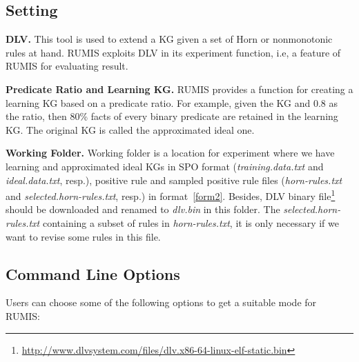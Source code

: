 \subsection{Setting}

\textbf{DLV.} This tool is used to extend a KG given a set of Horn or nonmonotonic rules at hand. RUMIS exploits DLV in its experiment function, i.e, a feature of RUMIS for evaluating result.

\textbf{Predicate Ratio and Learning KG.} RUMIS provides a function for creating a learning KG based on a predicate ratio. For example, given the KG and 0.8 as the ratio, then 80\% facts of every binary predicate are retained in the learning KG. The original KG is called the approximated ideal one.

\textbf{Working Folder.} Working folder is a location for experiment where we have learning and approximated ideal KGs in SPO format (\textit{training.data.txt} and \textit{ideal.data.txt}, resp.), positive rule and sampled positive rule files (\textit{horn-rules.txt} and \textit{selected.horn-rules.txt}, resp.) in format~\ref{form2}. Besides, DLV binary file\footnote{\url{http://www.dlvsystem.com/files/dlv.x86-64-linux-elf-static.bin}} should be downloaded and renamed to \textit{dlv.bin} in this folder. The \textit{selected.horn-rules.txt} containing a subset of rules in \textit{horn-rules.txt}, it is only necessary if we want to revise some rules in this file.

\subsection{Command Line Options}

Users can choose some of the following options to get a suitable mode for RUMIS:

